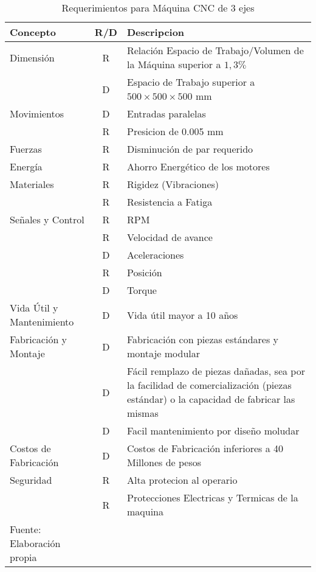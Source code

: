 \begin{longtable}{|>{\columncolor[gray]{0.85}}p{}|c|p{}|}
    \cline{1-3} \rowcolor[gray]{0.85}
    \textbf{Concepto} & \textbf{R/D} & \textbf{Descripcion } \\ \hline \endhead
    Dimensión   & R & Relación Espacio de Trabajo/Volumen de la Máquina superior a $1,3\%$ \\
                & D & Espacio de Trabajo superior a $500\times 500\times 500$ mm \\ \cline{1-3}
    Movimientos & D & Entradas  paralelas \\
                & R & Presicion de 0.005 mm \\ \cline{1-3}
    Fuerzas     & R & Disminución de par requerido \\ \cline{1-3}
    Energía     & R & Ahorro Energético de los motores \\ \cline{1-3}
    Materiales  & R & Rigidez (Vibraciones) \\
                & R & Resistencia a Fatiga \\ \cline{1-3}
    Señales y Control   & R & RPM \\
                        & R & Velocidad de avance \\
                        & D & Aceleraciones \\
                        & R & Posición \\
                        & D & Torque \\ \cline{1-3}
    Vida Útil y Mantenimiento & D & Vida útil mayor a 10 años \\ \cline{1-3}
    Fabricación y Montaje   & D & Fabricación con piezas estándares y montaje modular \\
                            & D & Fácil remplazo de piezas dañadas, sea por la facilidad de comercialización (piezas estándar) o la capacidad de fabricar las mismas \\
                            & D & Facil mantenimiento por diseño moludar\\ \cline{1-3}
    Costos de Fabricación   & D & Costos de Fabricación inferiores a 40 Millones de pesos \\ \cline{1-3}
    Seguridad               & R & Alta protecion al operario \\
                            & R & Protecciones Electricas y Termicas de la maquina \\
    \cline{1-3}
    \caption{Requerimientos para Máquina CNC de 3 ejes}{Fuente: Elaboración propia}
\end{longtable}